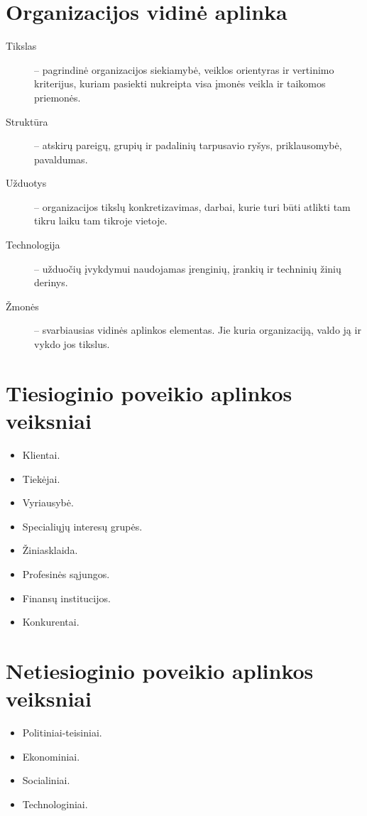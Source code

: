 \section{Organizacijos vidinė aplinka}

\begin{description}
  \item[Tikslas] – pagrindinė organizacijos siekiamybė, veiklos orientyras
    ir vertinimo kriterijus, kuriam pasiekti nukreipta visa įmonės veikla
    ir taikomos priemonės.
  \item[Struktūra] – atskirų pareigų, grupių ir padalinių tarpusavio
    ryšys, priklausomybė, pavaldumas.
  \item[Užduotys] – organizacijos tikslų konkretizavimas, darbai, kurie
    turi būti atlikti tam tikru laiku tam tikroje vietoje.
  \item[Technologija] – užduočių įvykdymui naudojamas įrenginių, įrankių
    ir techninių žinių derinys.
  \item[Žmonės] – svarbiausias vidinės aplinkos elementas. Jie kuria
    organizaciją, valdo ją ir vykdo jos tikslus.
\end{description}

\section{Tiesioginio poveikio aplinkos veiksniai}

\begin{itemize}
  \item Klientai.
  \item Tiekėjai.
  \item Vyriausybė.
  \item Specialiųjų interesų grupės.
  \item Žiniasklaida.
  \item Profesinės sąjungos.
  \item Finansų institucijos.
  \item Konkurentai.
\end{itemize}

\section{Netiesioginio poveikio aplinkos veiksniai}

\begin{itemize}
  \item Politiniai-teisiniai.
  \item Ekonominiai.
  \item Socialiniai.
  \item Technologiniai.
\end{itemize}

